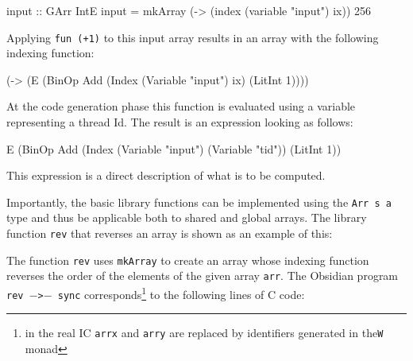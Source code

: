 \begin{code}
input :: GArr IntE 
input = mkArray (\ix -> (index (variable "input") ix)) 256
\end{code}

Applying {\tt fun (+1)} to this input array results in an array with the 
following indexing function:
\begin {code}
(\ix -> (E (BinOp Add (Index (Variable "input") ix) 
                      (LitInt 1)))) 
\end{code} 

At the code generation phase this function is evaluated using a variable 
representing a thread Id. The result is an expression looking as follows:
\begin{code}
E (BinOp Add (Index (Variable "input") (Variable "tid")) 
             (LitInt 1))
\end{code} 

This expression is a direct description of what is to be computed. 



Importantly, the basic library functions can be implemented using the 
{\tt Arr s a} type and thus be applicable both to shared and global arrays.
The library function {\tt rev} that reverses an array is shown as an example
of this: 

The function {\tt rev} uses {\tt mkArray} to create an array whose indexing 
function reverses the order of the elements of the given array {\tt arr}. 
The Obsidian program {\tt rev $-$>$-$ sync} 
corresponds\footnote{in the real IC {\tt arrx} and {\tt arry} are replaced by identifiers generated in the{\tt W} monad}
to the following lines of C code:
 
